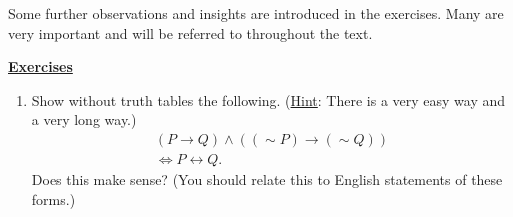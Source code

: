 \bigskip

Some further observations and insights are introduced in the
exercises.  Many are very important and will be referred to throughout the
text. 







\begin{center}\underline{\Large{\bf Exercises}}\end{center}
\bigskip
\begin{multicols}{2}
\begin{enumerate}

\item Show without truth tables the following.\footnotemark
\hphantom{. }(\underline{Hint}: There is a very easy way
and a very long way.) 
\begin{multline}
(P\longrightarrow Q)\wedge((\sim P)\longrightarrow(\sim Q))
\\ \iff P\longleftrightarrow Q.\end{multline}
Does this make sense?  (You should relate this to English statements
of these forms.)
\label{conversesexercise}
\end{enumerate}
\end{multicols}







